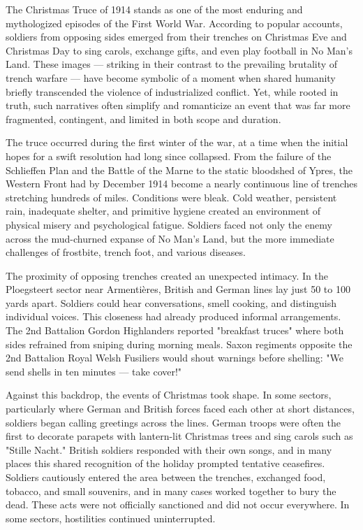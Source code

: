 The Christmas Truce of 1914 stands as one of the most enduring and mythologized episodes of the First World War. According to popular accounts, soldiers from opposing sides emerged from their trenches on Christmas Eve and Christmas Day to sing carols, exchange gifts, and even play football in No Man’s Land. These images — striking in their contrast to the prevailing brutality of trench warfare — have become symbolic of a moment when shared humanity briefly transcended the violence of industrialized conflict. Yet, while rooted in truth, such narratives often simplify and romanticize an event that was far more fragmented, contingent, and limited in both scope and duration.

The truce occurred during the first winter of the war, at a time when the initial hopes for a swift resolution had long since collapsed. From the failure of the Schlieffen Plan and the Battle of the Marne to the static bloodshed of Ypres, the Western Front had by December 1914 become a nearly continuous line of trenches stretching hundreds of miles. Conditions were bleak. Cold weather, persistent rain, inadequate shelter, and primitive hygiene created an environment of physical misery and psychological fatigue. Soldiers faced not only the enemy across the mud-churned expanse of No Man's Land, but the more immediate challenges of frostbite, trench foot, and various diseases.

The proximity of opposing trenches created an unexpected intimacy. In the Ploegsteert sector near Armentières, British and German lines lay just 50 to 100 yards apart. Soldiers could hear conversations, smell cooking, and distinguish individual voices. This closeness had already produced informal arrangements. The 2nd Battalion Gordon Highlanders reported "breakfast truces" where both sides refrained from sniping during morning meals. Saxon regiments opposite the 2nd Battalion Royal Welsh Fusiliers would shout warnings before shelling: "We send shells in ten minutes — take cover!"

Against this backdrop, the events of Christmas took shape. In some sectors, particularly where German and British forces faced each other at short distances, soldiers began calling greetings across the lines. German troops were often the first to decorate parapets with lantern-lit Christmas trees and sing carols such as "Stille Nacht." British soldiers responded with their own songs, and in many places this shared recognition of the holiday prompted tentative ceasefires. Soldiers cautiously entered the area between the trenches, exchanged food, tobacco, and small souvenirs, and in many cases worked together to bury the dead. These acts were not officially sanctioned and did not occur everywhere. In some sectors, hostilities continued uninterrupted.

